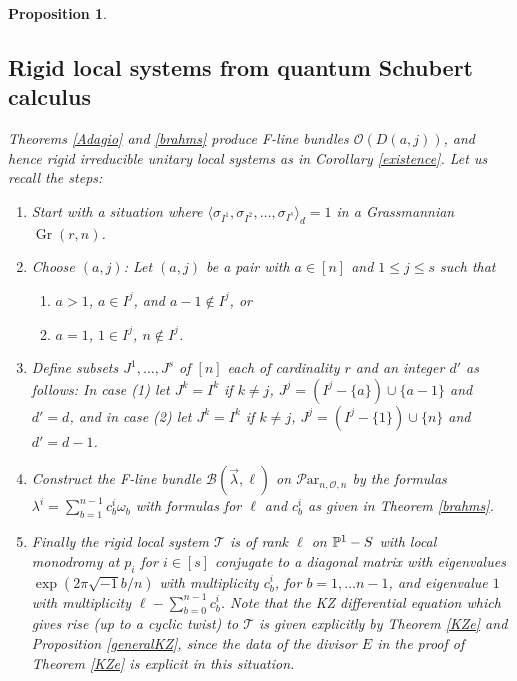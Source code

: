 \documentclass[11pt]{amsart}
\newcommand\mt{\mathcal{T}}
\newcommand\Par{\mathcal{P}\text{ar} }
\newcommand\Gr{\operatorname{Gr}}
\newtheorem{proposition}[theorem]{Proposition}
\numberwithin{theorem}{subsection}
\begin{document}
{\begin{proposition}
\subsection{Rigid local systems from quantum Schubert calculus}\label{qSC}
Theorems \ref{Adagio} and \ref{brahms} produce F-line bundles $\mathcal{O}(D(a,j))$, and hence rigid irreducible unitary local systems as in Corollary \ref{existence}. Let us recall the steps:
\begin{enumerate}
\item [(i)]Start with a situation where
 $\langle\sigma_{I^1}, \sigma_{I^2},\dots,\sigma_{I^s}\rangle_d= 1$ in a Grassmannian $\Gr(r,n)$.
\item[(ii)] Choose $(a,j)$: Let $(a,j)$ be a pair with $a\in[n]$ and $1\leq j\leq s$ such that
\begin{enumerate}
\item $a>1$, $a\in I^j$, and $a-1\not\in I^j$, or
\item $a=1$, $1\in I^j$, $n\not\in I^j$.
\end{enumerate}
\item[(iii)] Define subsets $J^1,\dots,J^s$ of $[n]$ each of cardinality $r$ and an integer $d'$ as follows:
In case (1) let $J^k=I^k$ if $k\neq j$, $J^j=(I^j-\{a\}) \cup \{a-1\}$ and $d'=d$, and in case (2) let  $J^k=I^k$ if $k\neq j$, $J^j=(I^j-\{1\}) \cup \{n\}$ and $d'=d-1$.
\item[(iv)] Construct the F-line bundle $\mathcal{B}(\vec{\lambda},\ell)$ on $\Par_{n,\mathcal{O},n}$
by the formulas $\lambda^i=\sum_{b=1}^{n-1}c^i_b\omega_b$ with formulas for $\ell$ and $c^i_b$
as given in Theorem \ref{brahms}.
 \item[(v)] Finally the rigid local system $\mt$ is of rank $\ell$ on $\Bbb{P}^1-S$ with local monodromy at $p_i$ for $i\in[s]$
 conjugate to a diagonal matrix with eigenvalues $\exp(2\pi\sqrt{-1}b/n)$ with multiplicity $c^i_b$, for $b=1,\dots n-1$, and eigenvalue $1$ with multiplicity $\ell-\sum_{b=0}^{n-1} c^i_b$. Note that the KZ differential equation which gives rise (up to a cyclic twist) to $\mathcal{T}$ is given explicitly by Theorem \ref{KZe} and Proposition \ref{generalKZ}, since the data of the divisor $E$ in the proof of Theorem \ref{KZe} is explicit in this situation.
 \end{enumerate}


\end{proposition}}
\end{document}
